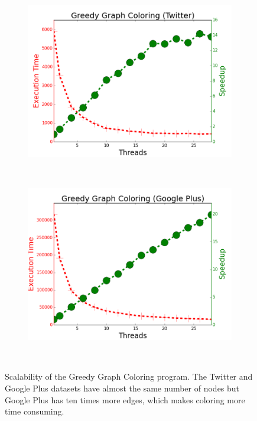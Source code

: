 \begin{figure}[]
        \begin{subfigure}[b]{\plotsize\textwidth}
                \includegraphics[width=\textwidth]{experiments/scalability/scale-greedy-graph-coloring-twitter.png}
                \label{fig:implementation:scale_ggc_twitter}
        \end{subfigure}
        ~
        \begin{subfigure}[b]{\plotsize\textwidth}
                \includegraphics[width=\textwidth]{experiments/scalability/scale-greedy-graph-coloring-gplus.png}
                \label{fig:implementation:scale_ggc_gplus}
        \end{subfigure}\\
        \caption{Scalability of the Greedy Graph Coloring program. The Twitter
           and Google Plus datasets have almost the same number of nodes but
           Google Plus has ten times more edges, which makes coloring more time
           consuming.}
        \label{fig:implementation:scale_ggc}
\end{figure}

